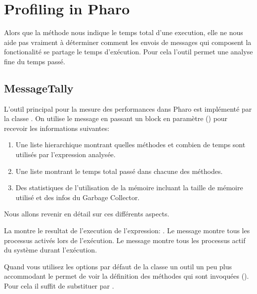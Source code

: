 \documentclass[a4paper,10pt,twoside]{book}
\begin{document}
\section{Profiling in Pharo} 

Alors que la m\'ethode  nous indique le temps total d'une execution, elle ne nous aide pas vraiment \`a d\'eterminer comment les envois de messages qui composent la fonctionalit\'e se partage le temps d'ex\'ecution.
Pour cela l'outil  permet une analyse fine du temps pass\'e. 


\subsection{MessageTally}
L'outil principal pour la mesure des performances dans Pharo est impl\'ement\'e par la classe . On utilise le message  en passant un block en param\`etre () pour recevoir les informations suivantes:

\begin{enumerate}
\item Une liste hierarchique montrant quelles m\'ethodes et combien de temps sont utilis\'es par l'expression analys\'ee.
\item Une liste montrant le temps total pass\'e dans chacune des m\'ethodes.
\item Des statistiques de l'utilisation de la m\'emoire incluant la taille de m\'emoire utilis\'e et des infos du Garbage Collector.
\end{enumerate}
Nous allons revenir en d\'etail sur ces diff\'erents aspects.

La  montre le resultat de l'execution de l'expression: 
.
Le message  montre tous les processus activ\'es lors de l'ex\'ecution. Le message  montre tous les processus actif du syst\`eme durant l'ex\'ecution. 



Quand vous utilisez les options par d\'efaut de la classe  un outil un peu plus accommodant le  permet de voir la d\'efinition des m\'ethodes qui sont invoqu\'ees (). Pour cela il suffit de substituer  par .
\end{document}
